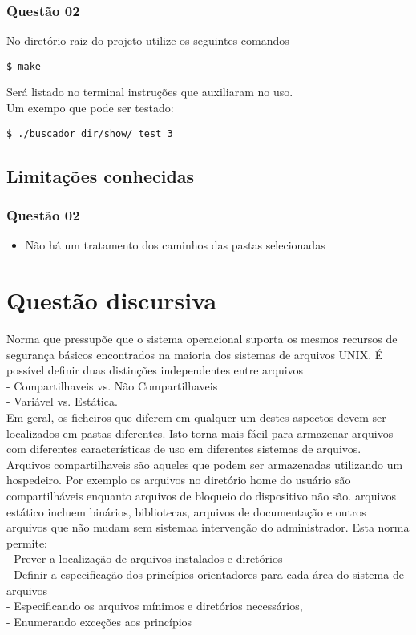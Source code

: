\documentclass[11pt,a4paper]{article}
\begin{document}
\subsubsection{Questão 02}
No diretório raiz do projeto utilize os seguintes comandos
\begin{verbatim}
$ make
\end{verbatim}
Será listado no terminal instruções que auxiliaram no uso.\\
Um exempo que pode ser testado:
\begin{verbatim}
$ ./buscador dir/show/ test 3
\end{verbatim}

\subsection{Limitações conhecidas}
\subsubsection{Questão 02}
\begin{itemize}
  \item Não há um tratamento dos caminhos das pastas selecionadas
\end{itemize}

\section{Questão discursiva}
Norma que pressupõe
que o sistema operacional suporta os mesmos
recursos de segurança básicos encontrados na maioria dos sistemas de arquivos
UNIX. É possível definir duas distinções independentes entre arquivos\\
 - Compartilhaveis vs. Não Compartilhaveis \\
 - Variável vs. Estática. \\
Em geral, os ficheiros que diferem em qualquer um destes aspectos devem ser
localizados em pastas diferentes. Isto torna mais fácil
para armazenar arquivos com diferentes características de uso em diferentes
sistemas de arquivos.\\
Arquivos compartilhaveis são aqueles que podem ser armazenadas utilizando
um hospedeiro. Por exemplo os arquivos no diretório
home do usuário são compartilháveis enquanto arquivos de bloqueio do dispositivo não são.
arquivos estático incluem binários, bibliotecas, arquivos de documentação e
outros arquivos que não mudam sem sistemaa intervenção do administrador.
Esta norma permite:\\
- Prever a localização de arquivos instalados e diretórios \\
- Definir a especificação dos princípios orientadores para cada área do sistema de arquivos\\
- Especificando os arquivos mínimos e diretórios necessários,\\
- Enumerando exceções aos princípios \\
\end{document}

